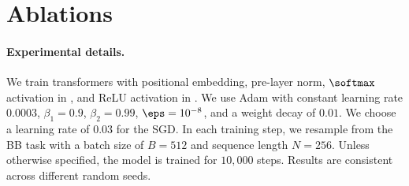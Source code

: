 \section{Ablations}
\label{sec:ablations}

\paragraph{Experimental details.} We train transformers with positional embedding, pre-layer norm, $\softmax$ activation in \attn, and ReLU activation in \mlp. 
We use Adam with constant learning rate $0.0003$, $\beta_1=0.9$, $\beta_2=0.99$, $\eps=10^{-8}$, and a weight decay of $0.01$. We choose a learning rate of $0.03$ for the SGD. In each training step, we resample from the BB task with a batch size of $B=512$ and sequence length $N=256$. Unless otherwise specified, the model is trained for $10,000$ steps. Results are consistent across different random seeds.

